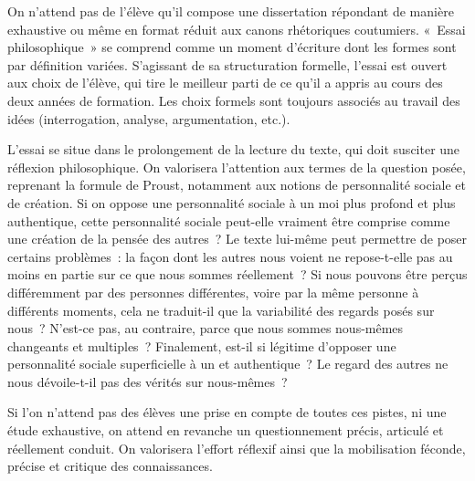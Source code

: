 {On n'attend pas de l'élève qu'il compose une dissertation répondant de manière
exhaustive ou même en format réduit aux canons rhétoriques coutumiers. «~Essai
philosophique~» se comprend comme un moment d'écriture dont les formes sont par
définition variées. S'agissant de sa structuration formelle, l'essai est ouvert aux choix
de l'élève, qui tire le meilleur parti de ce qu'il a appris au cours des deux années de
formation. Les choix formels sont toujours associés au travail des idées (interrogation,
analyse, argumentation, etc.).

L'essai se situe dans le prolongement de la lecture du texte, qui doit susciter
une réflexion philosophique. On valorisera l'attention aux termes de la question posée,
reprenant la formule de Proust, notamment aux notions de personnalité sociale et de
création. Si on oppose une personnalité sociale à un moi plus profond et plus
authentique, cette personnalité sociale peut-elle vraiment être comprise comme une
création de la pensée des autres~? Le texte lui-même peut permettre de poser certains
problèmes~: la façon dont les autres nous voient ne repose-t-elle pas au moins en
partie sur ce que nous sommes réellement~? Si nous pouvons être perçus
différemment par des personnes différentes, voire par la même personne à différents
moments, cela ne traduit-il que la variabilité des regards posés sur nous~? N'est-ce
pas, au contraire, parce que nous sommes nous-mêmes changeants et multiples~?
Finalement, est-il si légitime d'opposer une personnalité sociale superficielle à un  et authentique~? Le regard des autres ne nous dévoile-t-il pas des vérités sur
nous-mêmes~?

Si l'on n'attend pas des élèves une prise en compte de toutes ces pistes, ni une
étude exhaustive, on attend en revanche un questionnement précis, articulé et
réellement conduit. On valorisera l'effort réflexif ainsi que la mobilisation féconde,
précise et critique des connaissances.}


